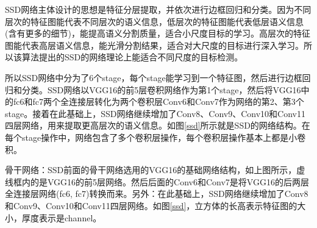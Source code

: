 SSD网络主体设计的思想是特征分层提取，并依次进行边框回归和分类。因为不同层次的特征图能代表不同层次的语义信息，低层次的特征图能代表低层语义信息(含有更多的细节)，能提高语义分割质量，适合小尺度目标的学习。高层次的特征图能代表高层语义信息，能光滑分割结果，适合对大尺度的目标进行深入学习。所以该算法提出的SSD的网络理论上能适合不同尺度的目标检测。

所以SSD网络中分为了6个stage，每个stage能学习到一个特征图，然后进行边框回归和分类。SSD网络以VGG16的前5层卷积网络作为第1个stage，然后将VGG16中的fc6和fc7两个全连接层转化为两个卷积层Conv6和Conv7作为网络的第2、第3个stage。接着在此基础上，SSD网络继续增加了Conv8、Conv9、Conv10和Conv11四层网络，用来提取更高层次的语义信息。如图\ref{ssd}所示就是SSD的网络结构。在每个stage操作中，网络包含了多个卷积层操作，每个卷积层操作基本上都是小卷积。

骨干网络：SSD前面的骨干网络选用的VGG16的基础网络结构，如上图所示，虚线框内的是VGG16的前5层网络。然后后面的Conv6和Conv7是将VGG16的后两层全连接层网络(fc6, fc7)转换而来。另外：在此基础上，SSD网络继续增加了Conv8和Conv9、Conv10和Conv11四层网络。如图\ref{ssd}，立方体的长高表示特征图的大小，厚度表示是channel。


